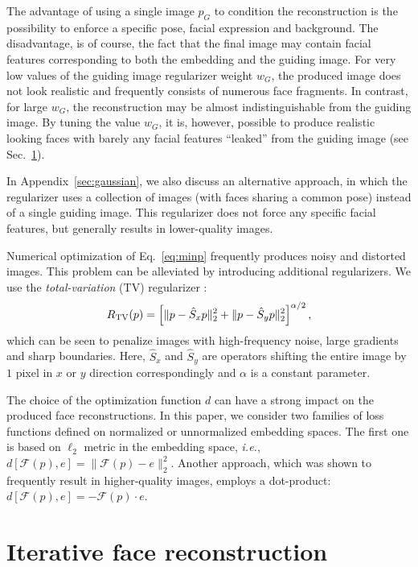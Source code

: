 \documentclass{article}
\def\Img{p}
\def\GImg{\Img_G}
\def\Emb{e}
\def\Reg{R}
\def\RegTV{\Reg_{\rm TV}}
\def\wG{w_G}
\def\NetF{\mc{F}}
\def\Metric{d}
\newcommand{\op}[1]{\hat{#1}}
\def\ShiftOp{\op{S}}
\newcommand{\mc}[1]{\mathcal{#1}}
\newcommand{\Eq}[1]{Eq.~\eqref{#1}}
\newcommand{\Sec}[1]{Sec.~\ref{#1}}
\newcommand{\hairsp}{\hspace{1pt}}
\def \ie{{\mbox{\textit{i.\hairsp{}e.},~}}}
\newcommand{\omtnips}[1]{#1}
\begin{document}
  The advantage of using a single image $\GImg$ to condition the reconstruction is the possibility to enforce a specific pose, facial expression and background.
  The disadvantage, is of course, the fact that the final image may contain  facial features corresponding to both the embedding and the guiding image.
  For very low values of the guiding image regularizer weight $\wG$, the produced image does not look realistic and frequently consists of numerous face fragments.
  In contrast, for large $\wG$, the reconstruction may be almost indistinguishable from the guiding image.
  By tuning the value $\wG$, it is, however, possible to produce realistic looking faces with barely any facial features ``leaked'' from the guiding image (see \Sec{sec:iterative}).
  \omtnips{
  In Appendix~\ref{sec:gaussian}, we also discuss an alternative approach, in which the regularizer uses a collection of images (with faces sharing a common pose) instead of a single guiding image.
  This regularizer does not force any specific facial features, but generally results in lower-quality images.}

  Numerical optimization of \Eq{eq:minp} frequently produces noisy and distorted images.
  This problem can be alleviated by introducing additional regularizers.
  We use the {\em total-variation} (TV) regularizer \cite{mahendran:15}:
  \begin{equation}
    \label{eq:rtv}
    \RegTV(\Img) = \left[ \| \Img - \ShiftOp_x \Img \|_2^2 + \| \Img - \ShiftOp_y \Img \|_2^2 \right]^{\alpha/2},
  \end{equation}
  which can be seen to penalize images with high-frequency noise, large gradients and sharp boundaries.
  Here, $\ShiftOp_x$ and $\ShiftOp_y$ are operators shifting the entire image by $1$ pixel in $x$ or $y$ direction correspondingly and $\alpha$ is a constant parameter.

  The choice of the optimization function $\Metric$ can have a strong impact on the produced face reconstructions.
  In this paper, we consider two families of loss functions defined on normalized or unnormalized embedding spaces.
  The first one is based on $\ell_2$ metric in the embedding space, \ie $\Metric\left[\NetF(\Img),\Emb\right]=\|\NetF(\Img)-\Emb\|_2^2$.
  Another approach, which was shown to frequently result in higher-quality images, employs a dot-product: $\Metric\left[\NetF(\Img),\Emb\right] = - \NetF(\Img) \cdot \Emb$.

\section{Iterative face reconstruction}
\label{sec:iterative}
\end{document}
